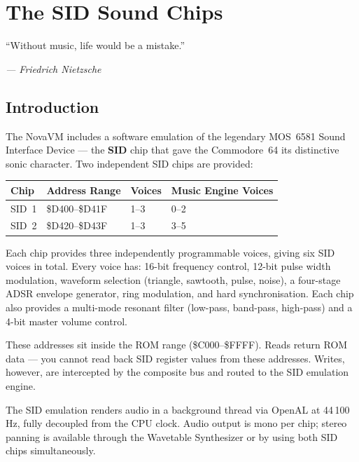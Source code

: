 \chapter{The SID Sound Chips}

\epigraph{``Without music, life would be a mistake.''}%
         {\textit{--- Friedrich Nietzsche}}

\section*{Introduction}

The NovaVM includes a software emulation of the legendary MOS~6581 Sound
Interface Device --- the \textbf{SID} chip that gave the Commodore~64 its
distinctive sonic character.  Two independent SID chips are provided:

\begin{center}
\small
\begin{tabular}{@{}llll@{}}
\toprule
\textbf{Chip} & \textbf{Address Range} & \textbf{Voices} & \textbf{Music Engine Voices} \\
\midrule
SID~1 & \$D400--\$D41F & 1--3 & 0--2 \\
SID~2 & \$D420--\$D43F & 1--3 & 3--5 \\
\bottomrule
\end{tabular}
\end{center}

Each chip provides three independently programmable voices, giving six SID
voices in total.  Every voice has: 16-bit frequency control, 12-bit pulse
width modulation, waveform selection (triangle, sawtooth, pulse, noise),
a four-stage ADSR envelope generator, ring modulation, and hard
synchronisation.  Each chip also provides a multi-mode resonant filter
(low-pass, band-pass, high-pass) and a 4-bit master volume control.

These addresses sit inside the ROM range (\$C000--\$FFFF).  Reads return
ROM data --- you cannot read back SID register values from these addresses.
Writes, however, are intercepted by the composite bus and routed to the SID
emulation engine.

\begin{notebox}
The SID emulation renders audio in a background thread via OpenAL at
44\,100\,Hz, fully decoupled from the CPU clock.  Audio output is mono per
chip; stereo panning is available through the Wavetable Synthesizer or by
using both SID chips simultaneously.
\end{notebox}


